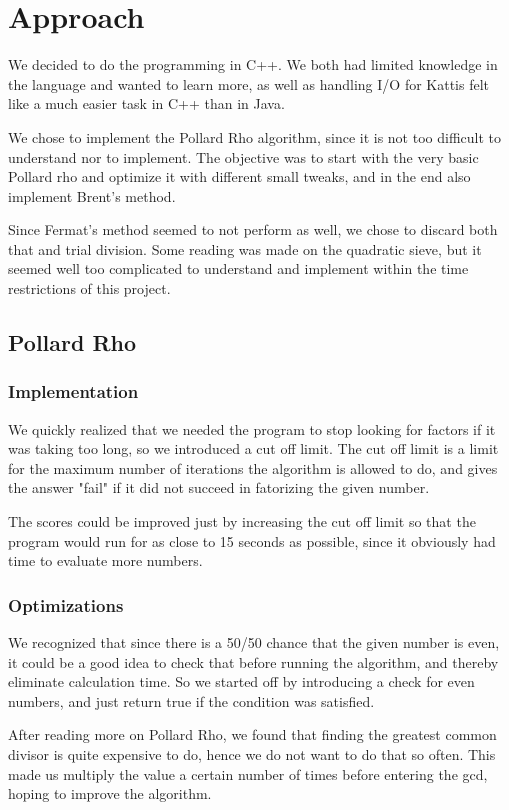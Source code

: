 \documentclass[a4paper, 12pt]{report}
\begin{document}
\chapter{Approach}
We decided to do the programming in C++. We both had limited knowledge in the language and wanted to learn more, as well as handling I/O for Kattis felt like a much easier task in C++ than in Java. 

We chose to implement the Pollard Rho algorithm, since it is not too difficult to understand nor to implement. The objective was to start with the very basic Pollard rho and optimize it with different small tweaks, and in the end also implement Brent's method.

Since Fermat's method seemed to not perform as well, we chose to discard both that and trial division. Some reading was made on the quadratic sieve, but it seemed well too complicated to understand and implement within the time restrictions of this project.

\section{Pollard Rho}
\subsection{Implementation}

We quickly realized that we needed the program to stop looking for factors if it was taking too long, so we introduced a cut off limit. The cut off limit is a limit for the maximum number of iterations the algorithm is allowed to do, and gives the answer "fail" if it did not succeed in fatorizing the given number. 

The scores could be improved just by increasing the cut off limit so that the program would run for as close to 15 seconds as possible, since it obviously had time to evaluate more numbers.

\subsection{Optimizations}
We recognized that since there is a 50/50 chance that the given number is even, it could be a good idea to check that before running the algorithm, and thereby eliminate calculation time. So we started off by introducing a check for even numbers, and just return true if the condition was satisfied.

After reading more on Pollard Rho, we found that finding the greatest common divisor is quite expensive to do, hence we do not want to do that so often. This made us multiply the value a certain number of times before entering the gcd, hoping to improve the algorithm.
\end{document}
